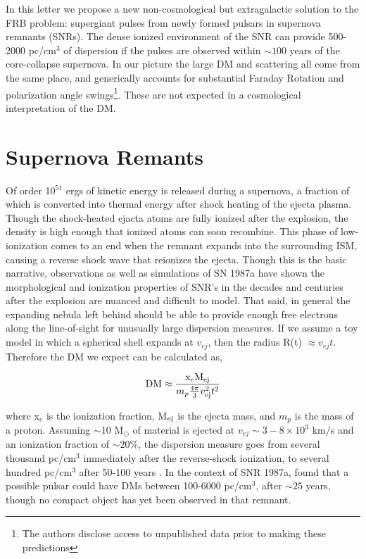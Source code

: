 \documentclass[useAMS,usenatbib]{mn2e}
\begin{document}
In this letter we propose a new non-cosmological but extragalactic
solution to the FRB problem: supergiant pulses from newly formed pulsars in 
supernova remnants (SNRs). The dense ionized environment of the SNR
can provide 500-2000 pc/cm$^3$ of dispersion if the pulses are observed 
within $\sim100$ years of the core-collapse supernova. In our picture the 
large DM and scattering all come from the same place, and generically
accounts for substantial Faraday Rotation and polarization angle
swings\footnote{\label{disclosure}The authors disclose access to 
unpublished data prior to making these predictions}. 
These are not expected in a cosmological interpretation of the DM.



\section{Supernova Remants}
Of order 10$^{51}$ ergs of kinetic energy is released during a supernova, a 
fraction of which is converted into thermal 
energy after shock heating of the 
ejecta plasma. Though the shock-heated ejacta atoms 
are fully ionized after the explosion, the density is high enough that
ionized atoms can soon recombine.
This phase of low-ionization comes to an end when the remnant expands 
into the surrounding ISM, causing a reverse shock wave that reionizes the ejecta.
Though this is the basic narrative, observations \citep{2014ApJ...796...82Z} 
as well as simulations \citep{2014ApJ...794..174P}
of SN 1987a have shown the morphological and ionization properties of SNR's
in the decades and centuries after the explosion are nuanced and 
difficult to model.
That said, in general the expanding nebula left behind 
should be able to provide enough free electrons
along the line-of-sight for unusually large dispersion measures. If we 
assume a toy model in which a spherical shell expands at $v_{ej}$, 
then the radius R(t) $\approx v_{ej} t$. Therefore the DM we expect can be 
calculated as,

\begin{equation}
\textup{DM} \approx  \frac{\textup{x}_e \textup{M}_{\rm ej}}{m_p \frac{4\pi}{3} v_{\rm ej}^2 t^2}
\end{equation}

\noindent where x$_e$ is the ionization fraction, 
M$_{\rm ej}$ is the ejecta mass, and $m_p$ 
is the mass of a proton. Assuming $\sim$10 M$_{\odot}$ of material 
is ejected at $v_{ej}\sim 3-8\times10^3$ km/s and an ionization fraction of 
$\sim20\% $, the dispersion measure goes from several 
thousand pc/cm$^3$ immediately
after the reverse-shock ionization, to several hundred pc/cm$^3$ after 50-100 years 
\cite{2014ApJ...796...82Z}.
In the context of SNR 1987a, \cite{2014ApJ...796...82Z} found that a possible pulsar 
could have DMs between 100-6000 pc/cm$^3$, after $\sim 25$ years, though 
no compact object has yet been observed in that remnant.
\end{document}
